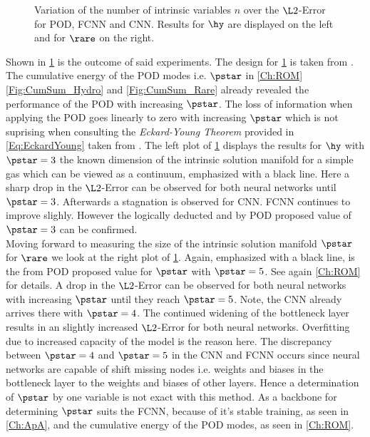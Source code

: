 \begin{figure}[htbp!]
	
	\caption{Variation of the number of intrinsic variables \(n\) over the $\L2$-Error for POD, FCNN and CNN. Results for $\hy$ are displayed on the left and for $\rare$ on the right.}
	\label{Fig:IntVar}
\end{figure}
Shown in \cref{Fig:IntVar} is the outcome of said experiments. The design for \cref{Fig:IntVar} is taken from \cite{Carlberg}. The cumulative energy of the POD modes i.e. $\pstar$ in \cref{Ch:ROM} \cref{Fig:CumSum_Hydro} and \cref{Fig:CumSum_Rare} already revealed the performance of the POD with increasing $\pstar$. The loss of information when applying the POD goes linearly to zero with increasing $\pstar$ which is not suprising when consulting the \textit{Eckard-Young Theorem} provided in \cref{Eq:EckardYoung} taken from \cite{Kutz}.
The left plot of \cref{Fig:IntVar} displays the results for $\hy$ with $\pstar=3$ the known dimension of the intrinsic solution manifold for a simple gas which can be viewed as a continuum, emphasized with a black line. Here a sharp drop in the $\L2$-Error can be observed for both neural networks until $\pstar = 3$. Afterwards a stagnation is observed for CNN. FCNN continues to improve slighly. However the logically deducted and by POD proposed value of $\pstar=3$ can be confirmed.\\
Moving forward to measuring the size of the intrinsic solution manifold \(\pstar\) for $\rare$ we look at the right plot of \cref{Fig:IntVar}. Again, emphasized  with a black line, is the from POD proposed value for $\pstar$ with $\pstar=5$. See again \cref{Ch:ROM} for details. A drop in the $\L2$-Error can be observed for both neural networks with increasing $\pstar$ until they reach $\pstar = 5$. Note, the CNN already arrives there with \(\pstar = 4\). The continued widening of the bottleneck layer results in an slightly increased $\L2$-Error for both neural networks. Overfitting due to increased capacity of the model is the reason here. The discrepancy between \(\pstar=4\) and \(\pstar = 5\) in the CNN and FCNN occurs since neural networks are capable of shift missing nodes i.e. weights and biases in the bottleneck layer to the weights and biases of other layers. Hence a determination of \(\pstar\) by one variable is not exact with this method. As a backbone for determining $\pstar$ suits the FCNN, because of it's stable training, as seen in \cref{Ch:ApA}, and the cumulative energy of the POD modes, as seen in \cref{Ch:ROM}.\\
